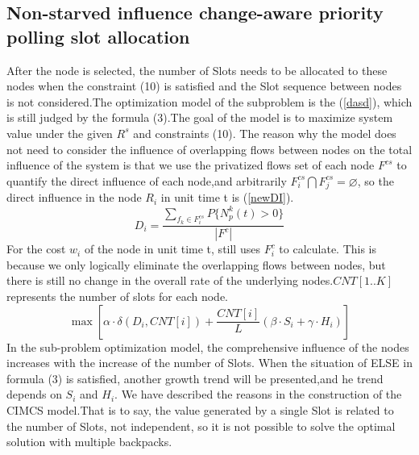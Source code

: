 \documentclass[conference]{IEEEtran}
\begin{document}
 


\subsection{Non-starved influence change-aware priority polling slot allocation}

After the node is selected, the number of Slots needs to be allocated to these nodes when the constraint (10) is satisfied and the Slot sequence between nodes is not considered.The optimization model of the subproblem is the (\ref{dasd}), which is still judged by the formula (3).The goal of the model is to maximize system value under the given $R^s$ and constraints (10). The reason why the model does not need to consider the influence of overlapping flows between nodes on the total influence of the system is that we use the privatized flows set of each node $F^{cs}$ to quantify the direct influence of each node,and arbitrarily $F^{cs}_i \bigcap F^{cs}_j = \varnothing$, so the direct influence in the node $R_i$ in unit time t is (\ref{newDI}).
\begin{equation}
{D}_i=\frac{\sum_{f_k \in F^{cs}_i} P\{N_p^k(t)> 0\}}{|F^c|} 
\label{newDI}
\end{equation}
For the cost $w_i$ of the node in unit time t, still uses $F_i^c$ to calculate. This is because we only logically eliminate the overlapping flows between nodes, but there is still no change in the overall rate of the underlying nodes.$CNT[1..K]$ represents the number of slots for each node.
\begin{equation}
\max [ \alpha \cdot \delta(D_i,CNT[i]) + \frac{CNT[i]}{L}(\beta \cdot S_i + \gamma \cdot H_i)  ]
\label{dasd}
\end{equation}
In the sub-problem optimization model, the comprehensive influence of the nodes increases with the increase of the number of Slots. When the situation of ELSE in formula (3) is satisfied, another growth trend will be presented,and he trend depends on $S_i$ and $H_i$. We have described the reasons in the construction of the CIMCS model.That is to say, the value generated by a single Slot is related to the number of Slots, not independent, so it is not possible to solve the optimal solution with multiple backpacks.
\end{document}
